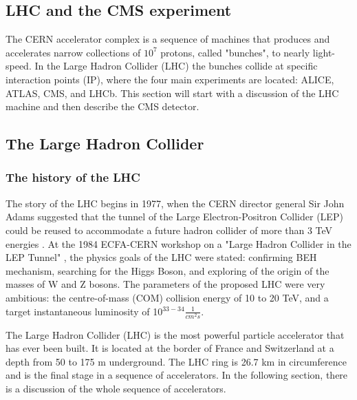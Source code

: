 
\begin{normalsize}



\chapter{LHC and the CMS experiment}
\label{ch:cms}
The CERN accelerator complex is a sequence of machines that produces and accelerates narrow collections of $10^{7}$ protons, called "bunches", to nearly light-speed. In the Large Hadron Collider (LHC) the bunches collide at specific interaction points (IP), where the four main experiments are located: ALICE, ATLAS, CMS, and LHCb. This section will start with a discussion of the LHC machine and then describe the CMS detector. 

\section{The Large Hadron Collider}\label{sec:cms_intro}



\subsection{The history of the LHC}

The story of the LHC begins in 1977, when the CERN director general Sir John Adams suggested that the tunnel of the Large Electron-Positron Collider (LEP) could be reused to accommodate a future hadron collider of more than 3 TeV energies \cite{Sadenius}. At the 1984 ECFA-CERN workshop on a "Large Hadron Collider in the LEP Tunnel" \cite{LHC1984}, the physics goals of the LHC were stated: confirming BEH mechanism, searching for the Higgs Boson, and exploring of the origin of the masses of W and Z bosons. The parameters of the proposed LHC were very ambitious: the centre-of-mass (COM) collision energy of 10 to 20 TeV, and a target instantaneous luminosity of 10$^{33-34}\frac{1}{cm^{2}s}$. 

The Large Hadron Collider (LHC) is the most powerful particle accelerator that has ever been built. It is located at the border of France and Switzerland at a depth from 50 to 175 m underground. The LHC ring is 26.7 km in circumference and is the final stage in a sequence of accelerators. In the following section, there is a discussion of the whole sequence of accelerators.



\end{normalsize}
